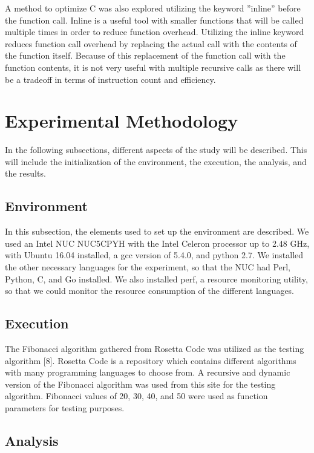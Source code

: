 \documentclass{sig-alternate}
\begin{document}
A method to optimize C was also explored utilizing the keyword ''inline'' before the function call. Inline is a useful tool with smaller functions that will be called multiple times in order to reduce function overhead. Utilizing the inline keyword reduces function call overhead by replacing the actual call with the contents of the function itself. Because of this replacement of the function call with the function contents, it is not very useful with multiple recursive calls as there will be a tradeoff in terms of instruction count and efficiency.

\section{Experimental Methodology}

In the following subsections, different aspects of the study will be described. This will include the initialization of the environment, the execution, the analysis, and the results.

\subsection{Environment}

In this subsection, the elements used to set up the environment are described. We used an Intel NUC NUC5CPYH with the Intel Celeron processor up to 2.48 GHz, with Ubuntu 16.04 installed, a gcc version of 5.4.0, and python 2.7. We installed the other necessary languages for the experiment, so that the NUC had Perl, Python, C, and Go installed. We also installed perf, a resource monitoring utility, so that we could monitor the resource consumption of the different languages. 

\subsection{Execution}

The Fibonacci algorithm gathered from Rosetta Code was utilized as the testing algorithm [8]. Rosetta Code is a repository which contains different algorithms with many programming languages to choose from. A recursive and dynamic version of the Fibonacci algorithm was used from this site for the testing algorithm. Fibonacci values of 20, 30, 40, and 50 were used as function parameters for testing purposes.

\subsection{Analysis}
\end{document}
